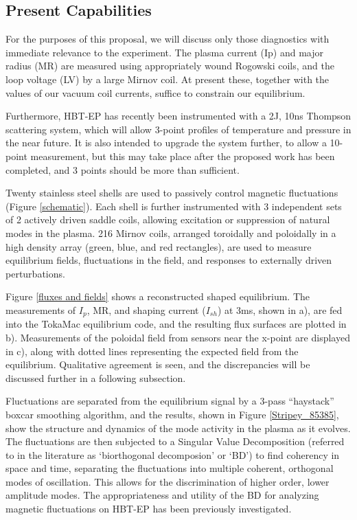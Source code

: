 \documentclass[aps,prl,twocolumn,superscriptaddress,groupedaddress]{revtex4}  %
\begin{document}
\subsection{Present Capabilities}
	For the purposes of this proposal, we will discuss only those diagnostics with immediate relevance to the experiment.  The plasma current (Ip) and major radius (MR) are measured using appropriately wound Rogowski coils, and the loop voltage (LV) by a large Mirnov coil.  At present these, together with the values of our vacuum coil currents, suffice to constrain our equilibrium.\par
	Furthermore, HBT-EP has recently been instrumented with a 2J, 10ns Thompson scattering system, which will allow 3-point profiles of temperature and pressure in the near future.  It is also intended to upgrade the system further, to allow a 10-point measurement, but this may take place after the proposed work has been completed, and 3 points should be more than sufficient.\par
	Twenty stainless steel shells are used to passively control magnetic fluctuations (Figure \ref{schematic}).  Each shell is further instrumented with 3 independent sets of 2 actively driven saddle coils, allowing excitation or suppression of natural modes in the plasma.  216 Mirnov coils, arranged toroidally and poloidally in a high density array (green, blue, and red rectangles), are used to measure equilibrium fields, fluctuations in the field, and responses to externally driven perturbations.\par
	Figure \ref{fluxes and fields} shows a reconstructed shaped equilibrium.  The measurements of $I_p$, MR, and shaping current ($I_{sh}$) at 3ms, shown in a), are fed into the TokaMac equilibrium code, and the resulting flux surfaces are plotted in b).  Measurements of the poloidal field from sensors near the x-point are displayed in c), along with dotted lines representing the expected field from the equilibrium.  Qualitative agreement is seen, and the discrepancies will be discussed further in a following subsection.\par
	Fluctuations are separated from the equilibrium signal by a 3-pass ``haystack'' boxcar smoothing algorithm, and the results, shown in Figure \ref{Stripey_85385}, show the structure and dynamics of the mode activity in the plasma as it evolves.  The fluctuations are then subjected to a Singular Value Decomposition (referred to in the literature as `biorthogonal decomposion' or `BD'\cite{de Wit}) to find coherency in space and time, separating the fluctuations into multiple coherent, orthogonal modes of oscillation.  This allows for the discrimination of higher order, lower amplitude modes.  The appropriateness and utility of the BD for analyzing magnetic fluctuations on HBT-EP has been previously investigated\cite{Levesque}.\par
\end{document}
